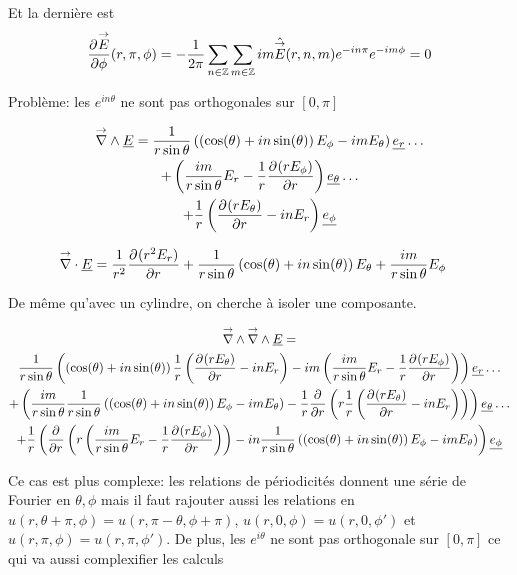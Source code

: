     Et la dernière est 
    \begin{equation}
        \ds\ddr{\phi}{\vE}(r,\pi,\phi) = -\frac{1}{2\pi}\sum_{n\in\ZZ}\sum_{m\in\ZZ} im\hat{\vE}(r,n,m) e^{-in\pi}e^{-im\phi}= 0
    \end{equation}

    \begin{TODO}
        Problème: les \(e^{in\theta}\) ne sont pas orthogonales sur \([0,\pi]\)
    \end{TODO}

    \begin{multline}
        \vrot \v{E} = \frac{1}{r\sin\theta}\left(\left(\cos(\theta) + in\sin(\theta)\right)E_\phi - im E_\theta\right)\v{e_r}\dots 
        \\
        + \left(\frac{im}{r\sin\theta}E_r - \frac{1}{r}\ddr{r}{(rE_\phi)} \right)\v{e_\theta} \dots
        \\
        + \frac{1}{r}\left(\ddr{r}{(rE_\theta)}-inE_r\right)\v{e_\phi}
    \end{multline}

    \begin{align}
        \vdiv \v{E} &= \frac{1}{r^2}\ddr{r}{(r^2E_r)}
        + \frac{1}{r\sin\theta}\left(\cos(\theta) + in\sin(\theta)\right)E_\theta + \frac{im}{r\sin\theta}{E_\phi}
    \end{align}

    De même qu'avec un cylindre, on cherche à isoler une composante.

    \begin{multline}
        \vrot \vrot \v{E} = \\
        \frac{1}{r\sin\theta}\left(\left(\cos(\theta) + in\sin(\theta)\right)\frac{1}{r}\left(\ddr{r}{(rE_\theta)}-inE_r\right) - im \left(\frac{im}{r\sin\theta}E_r - \frac{1}{r}\ddr{r}{(rE_\phi)} \right)\right)\v{e_r}\dots 
        \\
        + \left(\frac{im}{r\sin\theta}\frac{1}{r\sin\theta}\left(\left(\cos(\theta) + in\sin(\theta)\right)E_\phi - im E_\theta\right) - \frac{1}{r}\ddr{r}{}\left(r \frac{1}{r}\left(\ddr{r}{(rE_\theta)}-inE_r\right)\right) \right)\v{e_\theta} \dots
        \\
        + \frac{1}{r}\left(\ddr{r}{}\left(r \left(\frac{im}{r\sin\theta}E_r - \frac{1}{r}\ddr{r}{(rE_\phi)} \right)\right)-in\frac{1}{r\sin\theta}\left(\left(\cos(\theta) + in\sin(\theta)\right)E_\phi - im E_\theta\right)\right)\v{e_\phi}
    \end{multline}

    \begin{TODO}
      Ce cas est plus complexe: les relations de périodicités donnent une série de Fourier en \(\theta,\phi\) mais il faut rajouter aussi les relations en \(u(r,\theta+\pi,\phi) = u(r,\pi-\theta,\phi + \pi)\), \(u(r,0,\phi) = u(r,0,\phi')\) et \(u(r,\pi,\phi) = u(r,\pi,\phi')\). De plus, les \(e^{i\theta}\) ne sont pas orthogonale sur \([0,\pi]\) ce qui va aussi complexifier les calculs
    \end{TODO}
